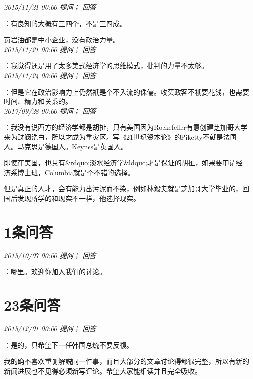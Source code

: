 \documentclass[twocolumn]{ctexart}
\begin{document}
\textit{\hfill\noindent\small 2015/11/21 00:00 提问； 回答}

：有良知的大概有三四个，不是三四成。

页岩油都是中小企业，没有政治力量。\\

\textit{\hfill\noindent\small 2015/11/21 00:00 提问； 回答}

：我觉得还是用了太多美式经济学的思维模式，批判的力量不太够。\\

\textit{\hfill\noindent\small 2015/11/24 00:00 提问； 回答}

：但是它在政治影响力上仍然衹是个不入流的侏儒。收买政客不衹要花钱，也需要时间、精力和关系的。\\

\textit{\hfill\noindent\small 2017/09/28 00:00 提问； 回答}

：我没有说西方的经济学都是胡扯，只有美国因为Rockefeller有意创建芝加哥大学来为财阀洗白，所以才成为重灾区。写《21世纪资本论》的Piketty不就是法国人。马克思是德国人。Keynes是英国人。

即使在美国，也只有\&rdquo;淡水经济学\&ldquo;才是保证的胡扯，如果要申请经济系博士班，Columbia就是个不错的选择。

但是真正的人才，会有能力出污泥而不染，例如林毅夫就是芝加哥大学毕业的，回国后发现所学的和现实不一样，他选择现实。\\

\section{1条问答}

\textit{\hfill\noindent\small 2015/10/07 00:00 提问； 回答}

：哪里。欢迎你加入我们的讨论。\\

\section{23条问答}

\textit{\hfill\noindent\small 2015/12/01 00:00 提问； 回答}

：是的，只希望下一任韩国总统不要反復。

我的确不喜欢重复解説同一件事，而且大部分的文章讨论得都很完整，所以有新的新闻进展也不见得必须新写评论。希望大家能细读并且完全吸收。\\
\end{document}
